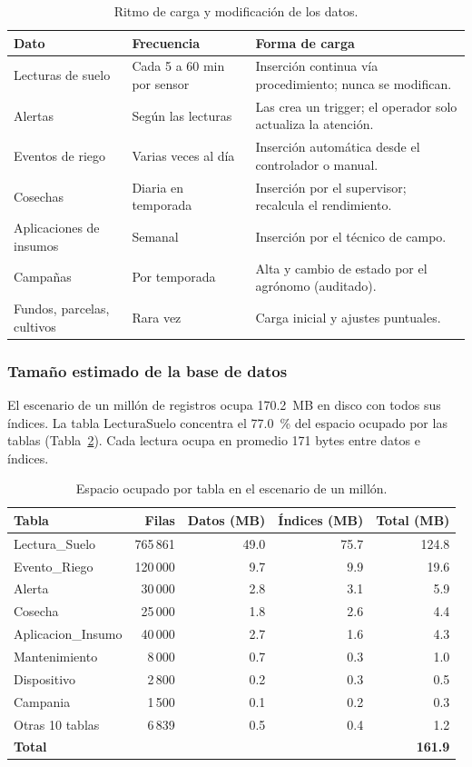 \documentclass[11pt,letterpaper]{article}
\newcommand{\tbus}{\textunderscore\allowbreak}
\newcommand{\tb}[1]{{\ttfamily\let\_\tbus #1}}
\begin{document}
\begin{table}[H]
\centering\small
\begin{tabularx}{\textwidth}{>{\raggedright\arraybackslash}p{3.3cm}>{\raggedright\arraybackslash}p{3.2cm}X}
\toprule
\textbf{Dato} & \textbf{Frecuencia} & \textbf{Forma de carga} \\
\midrule
Lecturas de suelo & Cada 5 a 60 min por sensor & Inserción continua vía procedimiento; nunca se modifican. \\
Alertas & Según las lecturas & Las crea un trigger; el operador solo actualiza la atención. \\
Eventos de riego & Varias veces al día & Inserción automática desde el controlador o manual. \\
Cosechas & Diaria en temporada & Inserción por el supervisor; recalcula el rendimiento. \\
Aplicaciones de insumos & Semanal & Inserción por el técnico de campo. \\
Campañas & Por temporada & Alta y cambio de estado por el agrónomo (auditado). \\
Fundos, parcelas, cultivos & Rara vez & Carga inicial y ajustes puntuales. \\
\bottomrule
\end{tabularx}
\caption{Ritmo de carga y modificación de los datos.}
\label{tab:ritmos}
\end{table}

\subsubsection{Tamaño estimado de la base de datos}

El escenario de un millón de registros ocupa 170.2~MB en disco con todos sus índices. La tabla \tb{Lectura\_Suelo} concentra el 77.0~\% del espacio ocupado por las tablas (Tabla~\ref{tab:tamanos}). Cada lectura ocupa en promedio 171 bytes entre datos e índices.

\begin{table}[H]
\centering\small
\begin{tabular}{lrrrr}
\toprule
Tabla & Filas & Datos (MB) & Índices (MB) & Total (MB) \\
\midrule
Lectura\_Suelo & 765\,861 & 49.0 & 75.7 & 124.8 \\
Evento\_Riego & 120\,000 & 9.7 & 9.9 & 19.6 \\
Alerta & 30\,000 & 2.8 & 3.1 & 5.9 \\
Cosecha & 25\,000 & 1.8 & 2.6 & 4.4 \\
Aplicacion\_Insumo & 40\,000 & 2.7 & 1.6 & 4.3 \\
Mantenimiento & 8\,000 & 0.7 & 0.3 & 1.0 \\
Dispositivo & 2\,800 & 0.2 & 0.3 & 0.5 \\
Campania & 1\,500 & 0.1 & 0.2 & 0.3 \\
Otras 10 tablas & 6\,839 & 0.5 & 0.4 & 1.2 \\
\textbf{Total} &  &  &  & \textbf{161.9} \\
\bottomrule
\end{tabular}
\caption{Espacio ocupado por tabla en el escenario de un millón.}\label{tab:tamanos}
\end{table}
\end{document}
